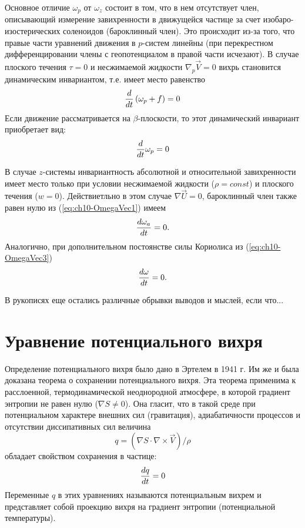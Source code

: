 Основное отличие $\omega_p$ от $\omega_z$ состоит в том, что в нем отсутствует член, описывающий измерение завихренности в движущейся частице за счет изобаро-изостерических соленоидов (бароклинный член). Это происходит из-за того, что правые части уравнений движения в $p$-систем линейны (при перекрестном дифференцировании члены с геопотенциалом в правой части исчезают). В случае плоского течения $\tau=0$ и несжимаемой жидкости $\nabla_p\vec{V}=0$ вихрь становится динамическим инвариантом, т.е. имеет место равенство
\begin{equation}
    \displaystyle\frac{d }{d t} \left( \omega_p + f \right) = 0
\end{equation}
Если движение рассматривается на $\beta$-плоскости, то этот динамический инвариант приобретает вид:
\begin{equation}
    \displaystyle\frac{d }{d t}\omega_p=0
\end{equation}

В случае $z$-системы инвариантность абсолютной и относительной завихренности имеет место только при условии несжимаемой жидкости ($\rho=const$) и плоского течения ($w=0$).  Действиетльно в этом случае $\nabla\vec{U}=0$, бароклинный член также равен нулю из (\ref{eq:ch10-OmegaVec1}) имеем
\begin{equation}
    \displaystyle\frac{d \omega_a}{d t}=0.
\end{equation}
Аналогично, при дополнительном постоянстве силы Кориолиса из (\ref{eq:ch10-OmegaVec3})
\begin{equation}
    \displaystyle\frac{d \omega}{d t}=0.
\end{equation}

\begin{warn}
    В рукописях еще остались различные обрывки выводов и мыслей, если что...
\end{warn}

\section{Уравнение потенциального вихря}
Определение потенциального вихря было дано в Эртелем в 1941 г. Им же и была доказана теорема о сохранении потенциального вихря. Эта теорема применима к расслоенной, термодинамической неоднородной атмосфере, в которой градиент энтропии не равен нулю ($\nabla S\neq0$). Она гласит, что в такой среде при потенциальном характере внешних сил (гравитация), адиабатичности процессов и отсутствии диссипативных сил величина
\begin{equation}
    \label{eq:ch10-q}
    q=\left( \nabla S\cdot\nabla\times\vec{V} \right)/\rho
\end{equation}
обладает свойством сохранения в частице:
\begin{equation}
    \label{eq:ch10-dqdt}
    \displaystyle\frac{d q}{d t}=0
\end{equation}
Переменные $q$ в этих уравнениях называются потенциальным вихрем и представляет собой проекцию вихря на градиент энтропии (потенциальной температуры). 

